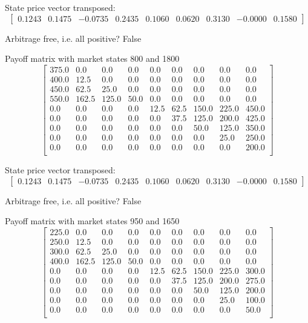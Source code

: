 \documentclass{article}
\begin{document}
State price vector transposed: \[
    \begin{bmatrix} 0.1243 & 0.1475 & -0.0735 & 0.2435 & 0.1060 & 0.0620 & 0.3130 & -0.0000 & 0.1580 \end{bmatrix}
\]

Arbitrage free, i.e. all positive? False

Payoff matrix with market states 800 and 1800
\[
    \begin{bmatrix}
        375.0 & 0.0   & 0.0   & 0.0  & 0.0  & 0.0  & 0.0   & 0.0   & 0.0   \\
        400.0 & 12.5  & 0.0   & 0.0  & 0.0  & 0.0  & 0.0   & 0.0   & 0.0   \\
        450.0 & 62.5  & 25.0  & 0.0  & 0.0  & 0.0  & 0.0   & 0.0   & 0.0   \\
        550.0 & 162.5 & 125.0 & 50.0 & 0.0  & 0.0  & 0.0   & 0.0   & 0.0   \\
        0.0   & 0.0   & 0.0   & 0.0  & 12.5 & 62.5 & 150.0 & 225.0 & 450.0 \\
        0.0   & 0.0   & 0.0   & 0.0  & 0.0  & 37.5 & 125.0 & 200.0 & 425.0 \\
        0.0   & 0.0   & 0.0   & 0.0  & 0.0  & 0.0  & 50.0  & 125.0 & 350.0 \\
        0.0   & 0.0   & 0.0   & 0.0  & 0.0  & 0.0  & 0.0   & 25.0  & 250.0 \\
        0.0   & 0.0   & 0.0   & 0.0  & 0.0  & 0.0  & 0.0   & 0.0   & 200.0 \\
    \end{bmatrix}
\]

State price vector transposed: \[
    \begin{bmatrix} 0.1243 & 0.1475 & -0.0735 & 0.2435 & 0.1060 & 0.0620 & 0.3130 & -0.0000 & 0.1580 \end{bmatrix}
\]

Arbitrage free, i.e. all positive? False

Payoff matrix with market states 950 and 1650
\[
    \begin{bmatrix}
        225.0 & 0.0   & 0.0   & 0.0  & 0.0  & 0.0  & 0.0   & 0.0   & 0.0   \\
        250.0 & 12.5  & 0.0   & 0.0  & 0.0  & 0.0  & 0.0   & 0.0   & 0.0   \\
        300.0 & 62.5  & 25.0  & 0.0  & 0.0  & 0.0  & 0.0   & 0.0   & 0.0   \\
        400.0 & 162.5 & 125.0 & 50.0 & 0.0  & 0.0  & 0.0   & 0.0   & 0.0   \\
        0.0   & 0.0   & 0.0   & 0.0  & 12.5 & 62.5 & 150.0 & 225.0 & 300.0 \\
        0.0   & 0.0   & 0.0   & 0.0  & 0.0  & 37.5 & 125.0 & 200.0 & 275.0 \\
        0.0   & 0.0   & 0.0   & 0.0  & 0.0  & 0.0  & 50.0  & 125.0 & 200.0 \\
        0.0   & 0.0   & 0.0   & 0.0  & 0.0  & 0.0  & 0.0   & 25.0  & 100.0 \\
        0.0   & 0.0   & 0.0   & 0.0  & 0.0  & 0.0  & 0.0   & 0.0   & 50.0  \\
    \end{bmatrix}
\]
\end{document}
